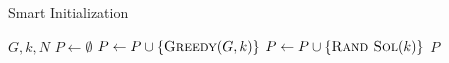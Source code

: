 \begin{algorithm}[h]
  \caption{Smart Initialization}\label{alg:GENETIKUS-ALGORITMUS:SMART-INIT}
  \begin{algorithmic}[1]
    \Require $G, k, N$
    \State $P \leftarrow \emptyset$
    \State $P \leftarrow P \cup  \left\{ \Call{Greedy}{G, k} \right\}$
    \EndFor
    \State $P \leftarrow P \cup  \left\{ \Call{Rand Sol}{k} \right\}$
    \EndWhile
    \State \Return $P$
  \end{algorithmic}
\end{algorithm}
